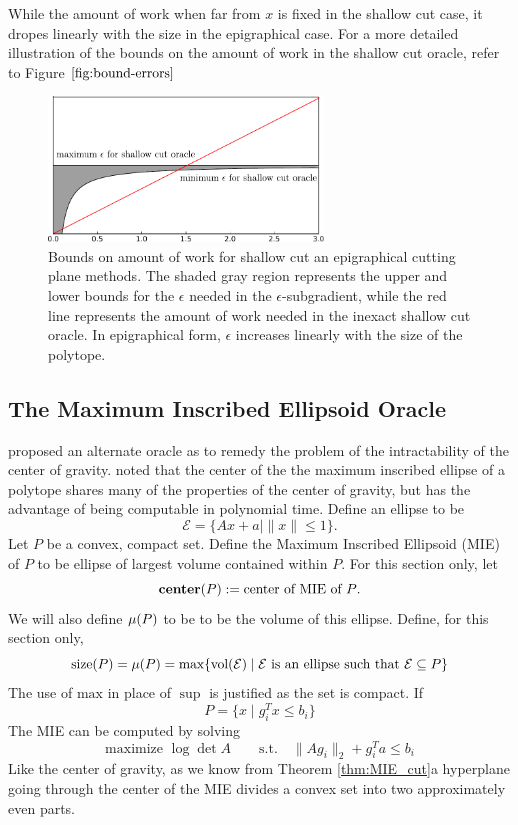 \begin{example}
While the amount of work when far from $x$ is fixed
in the shallow cut case, it dropes linearly with the size in the epigraphical
case. For a more detailed illustration of the bounds on the amount of work
in the shallow cut oracle, refer to Figure $\ref{fig:bound-errors}$

\begin{figure}
\begin{centering}
\includegraphics[width=0.65\textwidth]{cutting/epsilon_absx.pdf}
\par\end{centering}
\caption{Bounds on amount of work for shallow cut an epigraphical
cutting plane methods. The shaded gray region represents the
upper and lower bounds for the $\epsilon$ needed in the $\epsilon$-subgradient,
while the red line represents the amount of work needed in the inexact shallow
cut oracle. In epigraphical form, $\epsilon$ increases linearly with the size of the polytope.}\label{fig:bound-errors}
\end{figure} 

\end{example}

\subsection{The Maximum Inscribed Ellipsoid Oracle} 

\cite{tarasov1988method} proposed an alternate oracle as to remedy the problem
of the intractability of the center of gravity. \cite{tarasov1988method} noted
that the center of the  the maximum inscribed ellipse of a polytope shares
many of the properties of the center of gravity, but has the advantage of
being computable in polynomial time. Define an ellipse to be
$$
\mathcal{E} = \{ Ax + a\mid \|x\|\leq 1\}.
$$
Let $P$ be a convex, compact set.  Define the Maximum Inscribed Ellipsoid
(MIE) of $P$ to be ellipse of largest volume contained within $P$. For this
section only, let
$$
\mbox{\bf center}(P) := \mbox{center of MIE of $P$}.
$$
We will
also define $\mu(P)$ to be to be the volume of this ellipse. Define, for this section only,
$$
\mbox{size}(P) = \mu(P) = \mbox{max} \{ \textnormal{vol}(\mathcal{E}) \mid \mathcal{E} \mbox{ is an ellipse such that } \mathcal{E}\subseteq P \}
$$
The use of $\mbox{max}$ in place of $\sup$ is justified as the set is compact.
If 
$$P = \{ x \mid g_i^Tx \leq b_i \}$$
The MIE can be computed by solving
$$
\mbox{maximize } \log\det A \qquad \mbox{s.t.}\quad  \|Ag_i\|_2+g_i^Ta \leq b_i
$$
Like the center of gravity, as we know from Theorem \ref{thm:MIE_cut}a
hyperplane going through the center of the MIE divides a convex set into two
approximately even parts.

